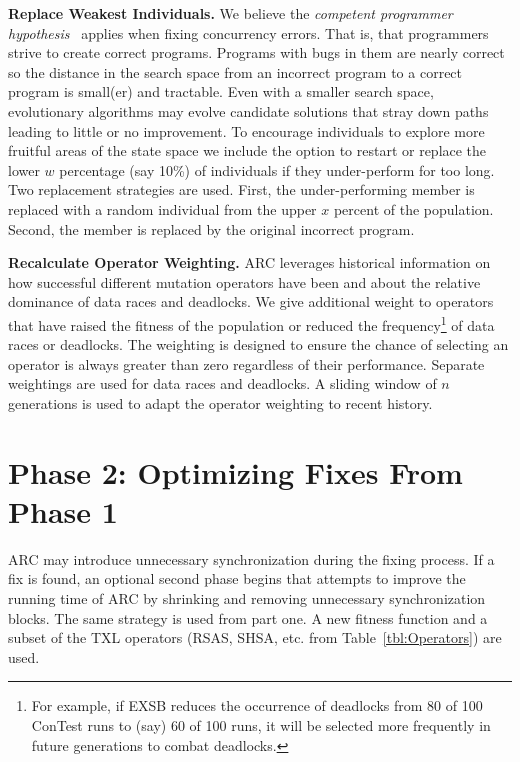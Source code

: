 \documentclass[runningheads,a4paper]{llncs}
\begin{document}
\textbf{Replace Weakest Individuals.} We believe the \textit{competent programmer hypothesis}~\cite{ABD+79} applies when fixing concurrency errors.  That is, that programmers strive to create correct programs.  Programs with bugs in them are nearly correct so the distance in the search space from an incorrect program to a correct program is small(er) and tractable.  Even with a smaller search space, evolutionary algorithms may evolve candidate solutions that stray down paths leading to little or no improvement. To encourage individuals to explore more fruitful areas of the state space we include the option to restart or replace the lower $w$ percentage (say 10\%) of individuals if they under-perform for too long.  Two replacement strategies are used. First, the under-performing member is replaced with a random individual from the upper $x$ percent of the population. Second, the member is replaced by the original incorrect program.


\textbf{Recalculate Operator Weighting.} ARC leverages historical information on how successful different mutation operators have been and about the relative dominance of data races and deadlocks. We give additional weight to operators that have raised the fitness of the population or reduced the frequency\footnote{For example, if EXSB reduces the occurrence of deadlocks from 80 of 100 ConTest runs to (say) 60 of 100 runs, it will be selected more frequently in future generations to combat deadlocks.} of data races or deadlocks.   The weighting is designed to ensure the chance of selecting an operator is always greater than zero regardless of their performance. Separate weightings are used for data races and deadlocks. A sliding window of $n$ generations is used to adapt the operator weighting to recent history. 

\section{Phase 2: Optimizing Fixes From Phase 1}
\label{sec:Phase2Nonfunctional}

ARC may introduce unnecessary synchronization during the fixing process. If a fix is found, an optional second phase begins that attempts to improve the running time of ARC by shrinking and removing unnecessary synchronization blocks.  The same strategy is used from part one.  A new fitness function and a subset of the TXL operators (RSAS, SHSA, etc. from Table~\ref{tbl:Operators}) are used. 
\end{document}
